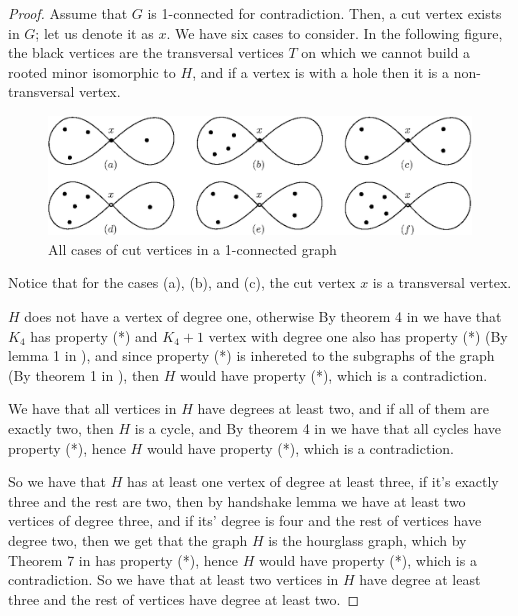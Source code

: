 \begin{proof}
    Assume that $G$ is 1-connected for contradiction. Then, a cut vertex exists in $G$; let us denote it as $x$. We have six cases to consider.
    In the following figure, the black vertices are the transversal vertices $T$ on which we cannot build a rooted minor isomorphic to $H$, and if 
    a vertex is with a hole then it is a non-transversal vertex.
       
    \begin{figure}[h]
       \centering
       \vspace{0.3cm}
       \includegraphics[width=13cm]{img/hourglass+1-cases.eps}
       \vspace{0.3cm}
       \caption{All cases of cut vertices in a 1-connected graph}
       \label{fig:2connected_counterexamples}
   \end{figure}
   
   Notice that for the cases (a), (b), and (c), the cut vertex $x$ is a transversal vertex.
   

   $H$ does not have a vertex of degree one, otherwise By theorem 4 in \cite{matthias_2022} we have that $K_4$ has property
   (*) and $K_4 + 1$ vertex with degree one also has property (*) (By lemma 1 in \cite{matthias_2022}), and since property (*) is inhereted to the subgraphs of 
    the graph (By theorem 1 in \cite{matthias_2022}), then $H$ would have property (*), which is a contradiction.

    We have that all vertices in $H$ have degrees at least two, and if all of them are exactly two, then $H$ is a cycle, and By theorem 4 in \cite{matthias_2022} we have that
    all cycles have property (*), hence $H$ would have property (*), which is a contradiction.

    So we have that $H$ has at least one vertex of degree at least three, if it's exactly three and the rest are two, then by handshake lemma we have at least 
    two vertices of degree three, and if its' degree is four and the rest of vertices have degree two, then we get that the graph $H$ is 
    the hourglass graph, which by Theorem 7 in \cite{matthias_2022} has property (*), hence $H$ would have property (*), which is a contradiction. So we have
    that at least two vertices in $H$ have degree at least three and the rest of vertices have degree at least two.


\end{proof}
